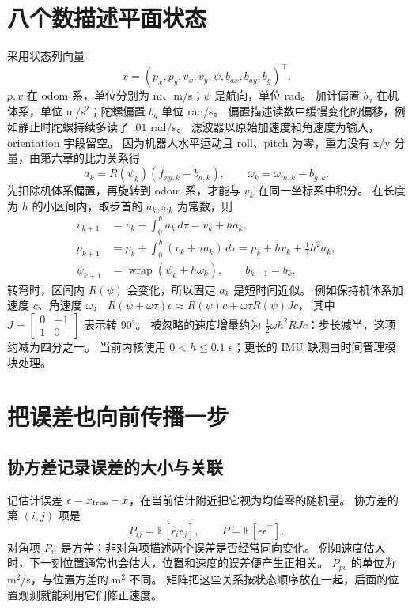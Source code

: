 \section{八个数描述平面状态}
采用状态列向量
\begin{equation}
x=(p_x,p_y,v_x,v_y,\psi,b_{ax},b_{ay},b_g)^\top.
\end{equation}
$p,v$ 在 odom 系，单位分别为 m、m/s；$\psi$ 是航向，单位 rad。
加计偏置 $b_a$ 在机体系，单位 m/s$^2$；陀螺偏置 $b_g$ 单位 rad/s。
偏置描述读数中缓慢变化的偏移，例如静止时陀螺持续多读了 $.01$ rad/s。
滤波器以原始加速度和角速度为输入，orientation 字段留空。
因为机器人水平运动且 roll、pitch 为零，重力没有 x/y 分量，由第六章的比力关系得
\begin{equation}
a_k=R(\psi_k)(f_{xy,k}-b_{a,k}),\qquad
\omega_k=\omega_{m,k}-b_{g,k}.
\end{equation}
先扣除机体系偏置，再旋转到 odom 系，才能与 $v_k$ 在同一坐标系中积分。
在长度为 $h$ 的小区间内，取步首的 $a_k,\omega_k$ 为常数，则
\begin{align}
v_{k+1}&=v_k+\int_0^h a_k\,d\tau=v_k+h a_k,\\
p_{k+1}&=p_k+\int_0^h(v_k+\tau a_k)\,d\tau
=p_k+h v_k+\tfrac12h^2a_k,\\
\psi_{k+1}&=\operatorname{wrap}(\psi_k+h\omega_k),\qquad b_{k+1}=b_k.
\end{align}
转弯时，区间内 $R(\psi)$ 会变化，所以固定 $a_k$ 是短时间近似。
例如保持机体系加速度 $c$、角速度 $\omega$，
$R(\psi+\omega\tau)c\approx R(\psi)c+\omega\tau R(\psi)Jc$，
其中 $J=\left[\begin{smallmatrix}0&-1\\1&0\end{smallmatrix}\right]$ 表示转 $90^\circ$。
被忽略的速度增量约为 $\tfrac12\omega h^2 RJc$：步长减半，这项约减为四分之一。
当前内核使用 $0<h\leq0.1$ s；更长的 IMU 缺测由时间管理模块处理。

\section{把误差也向前传播一步}
\subsection{协方差记录误差的大小与关联}
记估计误差 $\epsilon=x_{\rm true}-\hat x$，在当前估计附近把它视为均值零的随机量。
协方差的第 $(i,j)$ 项是
\begin{equation}
P_{ij}=\mathbb E[\epsilon_i\epsilon_j],\qquad P=\mathbb E[\epsilon\epsilon^\top].
\end{equation}
对角项 $P_{ii}$ 是方差；非对角项描述两个误差是否经常同向变化。
例如速度估大时，下一刻位置通常也会估大，位置和速度的误差便产生正相关。
$P_{pv}$ 的单位为 m$^2$/s，与位置方差的 m$^2$ 不同。
矩阵把这些关系按状态顺序放在一起，后面的位置观测就能利用它们修正速度。


